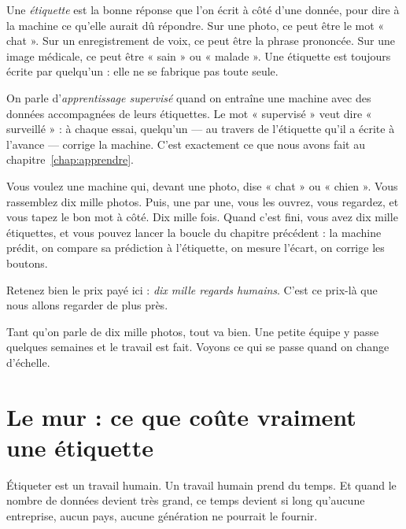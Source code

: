 \begin{definition}[L'étiquette][etiquette]
Une \emph{étiquette} est la bonne réponse que l'on écrit à côté d'une donnée,
pour dire à la machine ce qu'elle aurait dû répondre. Sur une photo, ce peut
être le mot « chat ». Sur un enregistrement de voix, ce peut être la phrase
prononcée. Sur une image médicale, ce peut être « sain » ou « malade ». Une
étiquette est toujours écrite par quelqu'un : elle ne se fabrique pas toute
seule.
\end{definition}

\begin{definition}
On parle d'\emph{apprentissage supervisé} quand on entraîne une machine avec
des données accompagnées de leurs étiquettes. Le mot « supervisé » veut dire
« surveillé » : à chaque essai, quelqu'un — au travers de l'étiquette qu'il a
écrite à l'avance — corrige la machine. C'est exactement ce que nous avons
fait au chapitre~\ref{chap:apprendre}.
\end{definition}

\begin{exemple}
Vous voulez une machine qui, devant une photo, dise « chat » ou « chien ».
Vous rassemblez dix mille photos. Puis, une par une, vous les ouvrez, vous
regardez, et vous tapez le bon mot à côté. Dix mille fois. Quand c'est fini,
vous avez dix mille étiquettes, et vous pouvez lancer la boucle du chapitre
précédent : la machine prédit, on compare sa prédiction à l'étiquette, on
mesure l'écart, on corrige les boutons.

Retenez bien le prix payé ici : \emph{dix mille regards humains}. C'est ce
prix-là que nous allons regarder de plus près.
\end{exemple}

Tant qu'on parle de dix mille photos, tout va bien. Une petite équipe y passe
quelques semaines et le travail est fait. Voyons ce qui se passe quand on
change d'échelle.

\section{Le mur : ce que coûte vraiment une étiquette}

\begin{enclair}
Étiqueter est un travail humain. Un travail humain prend du temps. Et quand
le nombre de données devient très grand, ce temps devient si long qu'aucune
entreprise, aucun pays, aucune génération ne pourrait le fournir.
\end{enclair}

